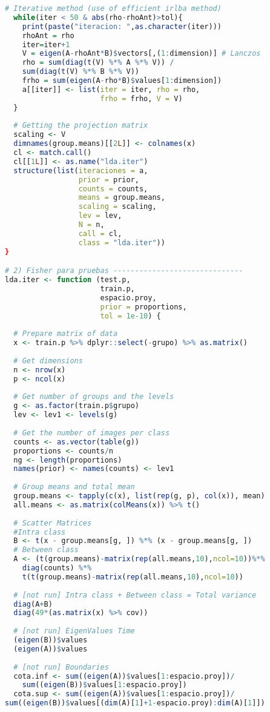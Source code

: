 \begin{lstlisting}[language=R, basicstyle=\small]
  # Iterative method (use of efficient irlba method)
  while(iter < 50 & abs(rho-rhoAnt)>tol){
    print(paste("iteracion: ",as.character(iter)))
    rhoAnt = rho
    iter=iter+1  
    V = eigen(A-rhoAnt*B)$vectors[,(1:dimension)] # Lanczos
    rho = sum(diag(t(V) %*% A %*% V)) /
    sum(diag(t(V) %*% B %*% V))
    frho = sum(eigen(A-rho*B)$values[1:dimension])
    a[[iter]] <- list(iter = iter, rho = rho,
                      frho = frho, V = V)
  }
  
  # Getting the projection matrix
  scaling <- V
  dimnames(group.means)[[2L]] <- colnames(x)
  cl <- match.call()
  cl[[1L]] <- as.name("lda.iter")
  structure(list(iteraciones = a, 
                 prior = prior, 
                 counts = counts, 
                 means = group.means, 
                 scaling = scaling, 
                 lev = lev, 
                 N = n, 
                 call = cl, 
                 class = "lda.iter"))
}

# 2) Fisher para pruebas ------------------------------
lda.iter <- function (test.p, 
                      train.p, 
                      espacio.proy,
                      prior = proportions, 
                      tol = 1e-10) {
  
  # Prepare matrix of data
  x <- train.p %>% dplyr::select(-grupo) %>% as.matrix()
  
  # Get dimensions
  n <- nrow(x)
  p <- ncol(x)
  
  # Get number of groups and the levels
  g <- as.factor(train.p$grupo)
  lev <- lev1 <- levels(g)
  
  # Get the number of images per class
  counts <- as.vector(table(g))
  proportions <- counts/n
  ng <- length(proportions)
  names(prior) <- names(counts) <- lev1
  
  # Group means and total mean
  group.means <- tapply(c(x), list(rep(g, p), col(x)), mean)
  all.means <- as.matrix(colMeans(x)) %>% t()
  
  # Scatter Matrices 
  #Intra class
  B <- t(x - group.means[g, ]) %*% (x - group.means[g, ]) 
  # Between class
  A <- (t(group.means)-matrix(rep(all.means,10),ncol=10))%*% 
    diag(counts) %*% 
    t(t(group.means)-matrix(rep(all.means,10),ncol=10)) 
  
  # [not run] Intra class + Between class = Total variance
  diag(A+B) 
  diag(49*(as.matrix(x) %>% cov))
  
  # [not run] EigenValues Time
  (eigen(B))$values
  (eigen(A))$values
  
  # [not run] Boundaries
  cota.inf <- sum((eigen(A))$values[1:espacio.proy])/
    sum((eigen(B))$values[1:espacio.proy])
  cota.sup <- sum((eigen(A))$values[1:espacio.proy])/
sum((eigen(B))$values[(dim(A)[1]+1-espacio.proy):dim(A)[1]])
  

\end{lstlisting}

